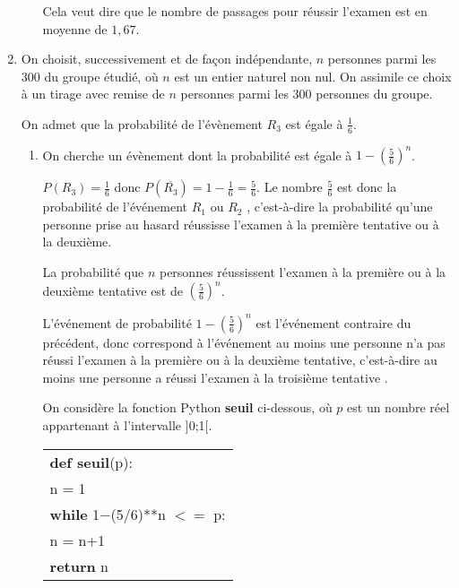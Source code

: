 \begin{enumerate}
\begin{enumerate}
Cela veut dire que le nombre de passages pour réussir l'examen est en moyenne de $1,67$.		
	\end{enumerate}
\item On choisit, successivement et de façon indépendante, $n$ personnes parmi les 300 du groupe étudié, où $n$ est un entier naturel non nul. On assimile ce choix à un tirage avec remise de $n$ personnes parmi les 300 personnes du groupe.

On admet que la probabilité de l'évènement $R_3$ est égale à $\frac{1}{6}$.
	\begin{enumerate}
		\item  On cherche un évènement dont la probabilité est égale à $1-\left(\frac{5}{6}\right)^n$.

$P(R_3)=\frac{1}{6}$ donc $P\left (\overline{R_3} \right )=1-\frac{1}{6}=\frac{5}{6}$.
Le nombre $\frac{5}{6}$ est donc la probabilité de l'événement \og $R_1$ ou $R_2$ \fg{}, c'est-à-dire la probabilité qu'une personne prise au hasard réussisse l'examen à la première tentative ou à la deuxième.

La probabilité que $n$ personnes réussissent l'examen à la première ou à la deuxième tentative est de $\left (\frac{5}{6}\right )^n$.

L'événement de probabilité $1-\left (\frac{5}{6}\right )^n$ est l'événement contraire du précédent, donc correspond à l'événement \og au moins une personne n'a pas réussi l'examen  à la première ou à la deuxième tentative\fg{}, c'est-à-dire \og au moins une personne a réussi l'examen à la troisième tentative \fg{}.

 \bigskip
 
On considère la fonction Python \textbf{seuil} ci-dessous, où $p$ est un nombre réel appartenant à l'intervalle ]0;1[.
\begin{center}
\begin{tabular}[]{|l|}
\hline
\textbf{def seuil}(p):\\
\hspace{2em}n = 1\\
\hspace{2em}\textbf{while} 1$-$(5/6)**n $<=$ p:\\
\hspace{4.5em}n = n+1\\
\hspace{2em}\textbf{return} n\\
\hline
\end{tabular}
\end{center}


\end{enumerate}
\end{enumerate}
